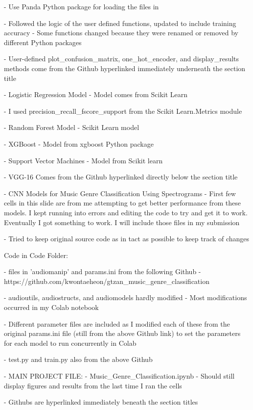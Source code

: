 		 - Use Panda Python package	for loading the files in

		 - Followed the logic of the user defined functions, updated to include training accuracy
		 	- Some functions changed because they were renamed or removed by different Python packages

		 - User-defined plot_confusion_matrix, one_hot_encoder, and display_results methods come from the Github hyperlinked immediately underneath the section title

		 - Logistic Regression Model
		 	- Model comes from Scikit Learn

		 - I used precision_recall_fscore_support from the Scikit Learn.Metrics module

		- Random Forest Model
			- Scikit Learn model

		- XGBoost
			- Model from xgboost Python package

		- Support Vector Machines
			- Model from Scikit learn

		- VGG-16 Comes from the Github hyperlinked directly below the section title

	- CNN Models for Music Genre Classification Using Spectrograms
		- First few cells in this slide are from me attempting to get better performance from these models. I kept running into errors and editing the code to try and get it to work. Eventually I got something to work. I will include those files in my submission

		- Tried to keep original source code as in tact as possible to keep track of changes


Code in Code Folder:

	- files in 'audiomanip' and params.ini from the following Github
		- https://github.com/kwontaeheon/gtzan_music_genre_classification

		- audioutils, audiostructs, and audiomodels hardly modified
			- Most modifications occurred in my Colab notebook

		- Different parameter files are included as I modified each of these from the original params.ini file (still from the above Github link) to set the parameters for each model to run concurrently in Colab

		- test.py and train.py also from the above Github

	- MAIN PROJECT FILE:
		- Music_Genre_Classification.ipynb
			- Should still display figures and results from the last time I ran the cells

			- Githubs are hyperlinked immediately beneath the section titles
